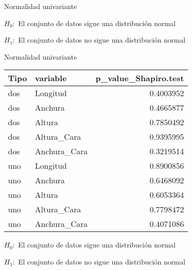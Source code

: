 \documentclass[ignorenonframetext,]{beamer}
\newenvironment{Shaded}{\begin{snugshade}}{\end{snugshade}}
\newcommand{\KeywordTok}[1]{\textcolor[rgb]{0.13,0.29,0.53}{\textbf{#1}}}
\newcommand{\DataTypeTok}[1]{\textcolor[rgb]{0.13,0.29,0.53}{#1}}
\newcommand{\StringTok}[1]{\textcolor[rgb]{0.31,0.60,0.02}{#1}}
\newcommand{\CommentTok}[1]{\textcolor[rgb]{0.56,0.35,0.01}{\textit{#1}}}
\newcommand{\OperatorTok}[1]{\textcolor[rgb]{0.81,0.36,0.00}{\textbf{#1}}}
\newcommand{\NormalTok}[1]{#1}
\begin{document}
\begin{frame}[fragile]{Normalidad univariante}

\(H_0:\) El conjunto de datos sigue una distribución normal

\(H_1:\) El conjunto de datos no sigue una distribución normal

\begin{Shaded}
\end{Shaded}

\end{frame}

\begin{frame}{Normalidad univariante}

\begin{tabular}{l|l|r}
\hline
Tipo & variable & p\_value\_Shapiro.test\\
\hline
dos & Longitud & 0.4003952\\
\hline
dos & Anchura & 0.4665877\\
\hline
dos & Altura & 0.7850492\\
\hline
dos & Altura\_Cara & 0.9395995\\
\hline
dos & Anchura\_Cara & 0.3219514\\
\hline
uno & Longitud & 0.8900856\\
\hline
uno & Anchura & 0.6468092\\
\hline
uno & Altura & 0.6053364\\
\hline
uno & Altura\_Cara & 0.7798472\\
\hline
uno & Anchura\_Cara & 0.4071086\\
\hline
\end{tabular}

\(H_0:\) El conjunto de datos sigue una distribución normal

\(H_1:\) El conjunto de datos no sigue una distribución normal

\end{frame}
\end{document}
